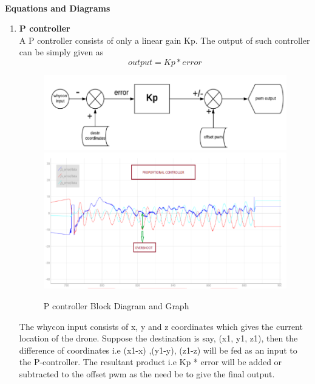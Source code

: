 \\
\textbf{Equations and Diagrams}
\begin{enumerate}
    \item \textbf{P controller}\\
    A P controller consists of only a linear gain Kp. The output of such controller can be simply given as\\
    \begin{equation}
        output = Kp * error
    \end{equation}
    \begin{figure}[H]
        \centering
        \includegraphics[width=0.8\linewidth]{SummerInterReport/project/Images-Major/pblock.png}
        \includegraphics[width=0.8\linewidth]{SummerInterReport/project/Images-Major/pgraph.png}
        \caption{P controller Block Diagram and Graph}
        \label{fig:Pcontroller}
    \end{figure}
    The whycon input consists of x, y and z coordinates which gives the current location of the drone. Suppose the destination is say, (x1, y1, z1), then the difference of coordinates i.e (x1-x) ,(y1-y), (z1-z) will be fed as an input to the P-controller. The resultant product i.e Kp * error will be added or subtracted to the offset pwm as the need be to give the final output.
    

\end{enumerate}
